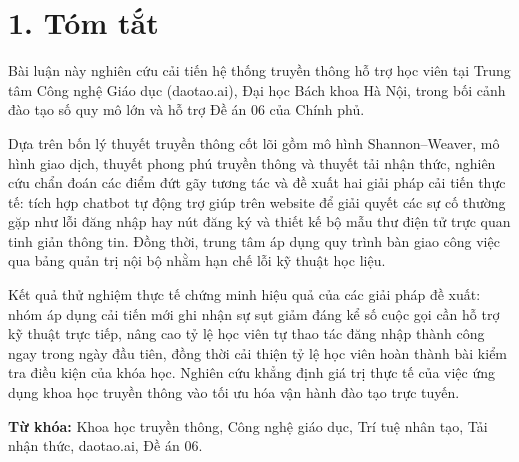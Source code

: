 \section*{1. Tóm tắt}

Bài luận này nghiên cứu cải tiến hệ thống truyền thông hỗ trợ học viên tại Trung tâm Công nghệ Giáo dục (daotao.ai), Đại học Bách khoa Hà Nội, trong bối cảnh đào tạo số quy mô lớn và hỗ trợ Đề án 06 của Chính phủ.

Dựa trên bốn lý thuyết truyền thông cốt lõi gồm mô hình Shannon–Weaver, mô hình giao dịch, thuyết phong phú truyền thông và thuyết tải nhận thức, nghiên cứu chẩn đoán các điểm đứt gãy tương tác và đề xuất hai giải pháp cải tiến thực tế: tích hợp chatbot tự động trợ giúp trên website để giải quyết các sự cố thường gặp như lỗi đăng nhập hay nút đăng ký và thiết kế bộ mẫu thư điện tử trực quan tinh giản thông tin. Đồng thời, trung tâm áp dụng quy trình bàn giao công việc qua bảng quản trị nội bộ nhằm hạn chế lỗi kỹ thuật học liệu.

Kết quả thử nghiệm thực tế chứng minh hiệu quả của các giải pháp đề xuất: nhóm áp dụng cải tiến mới ghi nhận sự sụt giảm đáng kể số cuộc gọi cần hỗ trợ kỹ thuật trực tiếp, nâng cao tỷ lệ học viên tự thao tác đăng nhập thành công ngay trong ngày đầu tiên, đồng thời cải thiện tỷ lệ học viên hoàn thành bài kiểm tra điều kiện của khóa học. Nghiên cứu khẳng định giá trị thực tế của việc ứng dụng khoa học truyền thông vào tối ưu hóa vận hành đào tạo trực tuyến.

\vspace{0.5cm}
\noindent \textbf{Từ khóa:} Khoa học truyền thông, Công nghệ giáo dục, Trí tuệ nhân tạo, Tải nhận thức, daotao.ai, Đề án 06.
